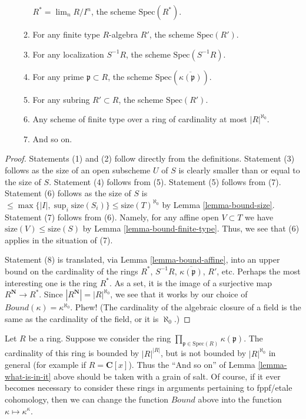 \begin{lemma}
\begin{enumerate}
\begin{enumerate}
$R^* = \lim_n R/I^n$, the scheme $\text{Spec}(R^*)$.
\item For any finite type $R$-algebra $R'$, the
scheme $\text{Spec}(R')$.
\item For any localization $S^{-1}R$, the scheme $\text{Spec}(S^{-1}R)$.
\item For any prime $\mathfrak p \subset R$, the scheme
$\text{Spec}(\overline{\kappa(\mathfrak p)})$.
\item For any subring $R' \subset R$, the scheme
$\text{Spec}(R')$.
\item Any scheme of finite type over a ring of cardinality at most
$|R|^{\aleph_0}$.
\item And so on.
\end{enumerate}
\end{enumerate}
\end{lemma}

\begin{proof}
Statements (1) and (2) follow directly from the definitions.
Statement (3) follows as the size of an open subscheme $U$ of $S$ is
clearly smaller than or equal to the size of $S$.
Statement (4) follows from (5).
Statement (5) follows from (7).
Statement (6) follows as the size of $S$ is
$\leq \max\{|I|, \sup_i \text{size}(S_i)\} \leq \text{size}(T)^{\aleph_0}$
by Lemma \ref{lemma-bound-size}. Statement (7) follows from (6).
Namely, for any affine open $V \subset T$ we have
$\text{size}(V) \leq \text{size}(S)$ by
Lemma \ref{lemma-bound-finite-type}.
Thus, we see that (6) applies in the situation of (7).

\medskip\noindent
Statement (8) is translated, via Lemma \ref{lemma-bound-affine},
into an upper bound on the cardinality of the rings
$R^*$, $S^{-1}R$, $\overline{\kappa(\mathfrak p)}$, $R'$, etc.
Perhaps the most interesting one is the ring $R^*$. As a
set, it is the image of a surjective map $R^{\mathbf{N}} \to R^*$.
Since $|R^{\mathbf{N}}| = |R|^{\aleph_0}$, we see that
it works by our choice of $Bound(\kappa) = \kappa^{\aleph_0}$.
Phew! (The cardinality of the algebraic closure of a field
is the same as the cardinality of the field, or it is $\aleph_0$.)
\end{proof}

\begin{remark}
\label{remark-what-is-not-in-it}
Let $R$ be a ring. Suppose we consider the ring
$\prod_{\mathfrak p \in \text{Spec}(R)} \kappa(\mathfrak p)$.
The cardinality of this ring is bounded by $|R|^{|R|}$, but is not bounded by
$|R|^{\aleph_0}$ in general (for example if $R = \mathbf{C}[x]$).
Thus the ``And so on'' of Lemma \ref{lemma-what-is-in-it} above
should be taken with a grain of salt. Of course, if it ever becomes
necessary to consider these rings in arguments pertaining to
fppf/etale cohomology, then we can change the function
$Bound$ above into the function $\kappa \mapsto \kappa^\kappa$.
\end{remark}



